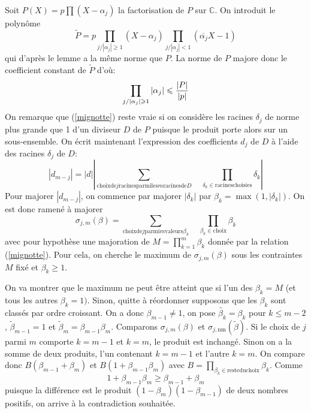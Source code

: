 \documentclass[a4paper,11pt]{article}
\begin{document}
\begin{giacjshere}
Soit $P ( X ) = p \prod ( X - \alpha_j )$ la factorisation de $P$ sur
$\mathbb{C}$. On introduit le polynôme
\[ \tilde{P} = p \prod_{j / | \alpha_j | \geqslant 1} ( X - \alpha_j )
   \prod_{j / | \alpha_j | < 1} (  \overline{\alpha_j} X - 1 ) \]
qui d'après le lemme a la même norme que $P$. La norme de $P$ majore donc le
coefficient constant de $\tilde{P} $ d'où:
\begin{equation}
  \label{mignotte} \text{$ \prod_{j / | \alpha_j | \geqslant 1} | \alpha_j |
  \leqslant \frac{| P |}{| p |}$}
\end{equation}
On remarque que (\ref{mignotte}) reste vraie si on considère les
racines $\delta_j$ de norme plus grande que 1 d'un diviseur $D$ de $P$ puisque
le produit porte alors sur un sous-ensemble. On écrit maintenant l'expression
des coefficients $d_j$ de $D$ à l'aide des racines $\delta_j$ de $D$:
\[ | d_{m - j} | = | d | \left| \sum_{\mbox{choix} \mbox{de} j \mbox{racines}
   \mbox{parmi} \mbox{les} m \mbox{racines} \mbox{de} D} \quad  \prod_{\delta_k \in
   \mbox{racines} \mbox{choisies}} \delta_k \right| \]
Pour majorer $| d_{m - j} |$, on commence par majorer $| \delta_k |$ par
$\beta_k = \max ( 1, | \delta_k | )$. On est donc ramené à majorer
\[ \sigma_{j, m} ( \beta ) = \sum_{\mbox{choix} \mbox{de} j \mbox{parmi} m
   \mbox{valeurs} \beta_k} \quad \prod_{\beta_k \in \mbox{choix}} \beta_k  \]
avec pour hypothèse une majoration de $M = \prod_{k = 1}^m \beta_k$ donnée par
la relation (\ref{mignotte}). Pour cela, on cherche le maximum de $\sigma_{j,
m} ( \beta )$ sous les contraintes $M$ fixé et $\beta_k \geqslant 1$.

On va montrer que le maximum ne peut être atteint que si l'un des $\beta_k =
M$ (et tous les autres $\beta_k = 1 )$. Sinon, quitte à réordonner supposons
que les $\beta_k$ sont classés par ordre croissant. On a donc $\beta_{m - 1}
\neq 1$, on pose $\widetilde{\beta_k} = \beta_k$ pour $k \leqslant m - 2$,
$\tilde{\beta}_{m - 1} = 1$ et $\tilde{\beta}_m = \beta_{m - 1} \beta_m$.
Comparons $\sigma_{j, m} ( \beta )$ et $\sigma_{j, \mbox{nm}} ( \tilde{\beta}
)$. Si le choix de $j$ parmi $m$ comporte $k = m - 1$ et $k = m$, le produit
est inchangé. Sinon on a la somme de deux produits, l'un contenant $k = m - 1$
et l'autre $k = m$. On compare donc $B ( \beta_{m - 1} + \beta_m )$ et $B ( 1
+ \beta_{m - 1} \beta_m )$ avec $B = \prod_{\beta_k \in \mbox{reste} \mbox{du}
\mbox{choix}} \beta_k$. Comme
\[ \text{$1 + \beta_{m - 1} \beta_m \geqslant \beta_{m - 1} + \beta_m$} \]
puisque la différence est le produit $(1-\beta_m)(1-\beta_{m-1})$ de deux
nombres positifs, on arrive à la contradiction souhaitée.


\end{giacjshere}
\end{document}
